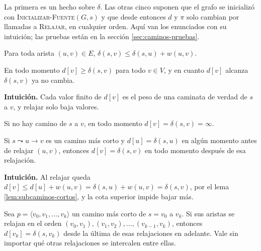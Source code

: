 \documentclass[11pt,letterpaper]{article}
\begin{document}
La primera es un hecho sobre $\delta$. Las otras cinco suponen que el
grafo se inicializó con \textsc{Inicializar-Fuente}$(G, s)$ y que
desde entonces $d$ y $\pi$ solo cambian por llamadas a
\textsc{Relajar}, en cualquier orden. Aquí van los enunciados con su
intuición; las pruebas están en la sección \ref{sec:caminos-pruebas}.

\begin{proposicion}
  \label{prop:triangulo}
  Para toda arista $(u, v) \in E$,
  $\delta(s, v) \le \delta(s, u) + w(u, v)$.
\end{proposicion}

\begin{proposicion}
  \label{prop:cota-superior}
  En todo momento $d[v] \ge \delta(s, v)$ para todo $v \in V$, y en
  cuanto $d[v]$ alcanza $\delta(s, v)$ ya no cambia.
\end{proposicion}

\textbf{Intuición.} Cada valor finito de $d[v]$ es el peso de una
caminata de verdad de $s$ a $v$, y relajar solo baja valores.

\begin{proposicion}
  \label{prop:sin-camino}
  Si no hay camino de $s$ a $v$, en todo momento
  $d[v] = \delta(s, v) = \infty$.
\end{proposicion}

\begin{proposicion}
  \label{prop:convergencia}
  Si $s \leadsto u \to v$ es un camino más corto y
  $d[u] = \delta(s, u)$ en algún momento antes de relajar $(u, v)$,
  entonces $d[v] = \delta(s, v)$ en todo momento después de esa
  relajación.
\end{proposicion}

\textbf{Intuición.} Al relajar queda
$d[v] \le d[u] + w(u, v) = \delta(s, u) + w(u, v) = \delta(s, v)$,
por el lema \ref{lem:subcaminos-cortos}, y la cota superior impide
bajar más.

\begin{proposicion}
  \label{prop:relajacion-caminos}
  Sea $p = \langle v_0, v_1, \dots, v_k\rangle$ un camino más corto de
  $s = v_0$ a $v_k$. Si sus aristas se relajan en el orden
  $(v_0, v_1), (v_1, v_2), \dots, (v_{k-1}, v_k)$, entonces
  $d[v_k] = \delta(s, v_k)$ desde la última de esas relajaciones en
  adelante. Vale sin importar qué otras relajaciones se intercalen
  entre ellas.
\end{proposicion}
\end{document}
